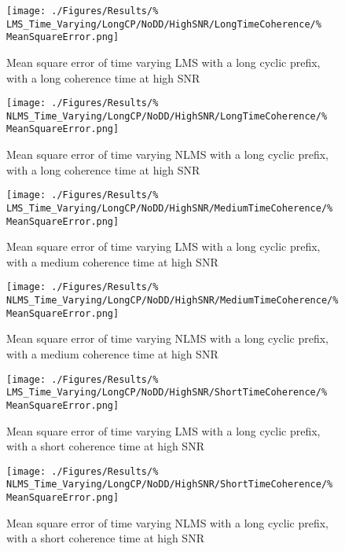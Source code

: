 \begin{figure}[ht]
	\begin{minipage}{0.49\textwidth}
		\texttt{[image: ./Figures/Results/\%
	LMS\_Time\_Varying/LongCP/NoDD/HighSNR/LongTimeCoherence/\%
	MeanSquareError.png]}
		\captionsetup{width=0.75\linewidth}
		\caption{Mean square error of time varying LMS with a 
		long cyclic prefix, with a long coherence time at 
		high SNR}
	\label{fig:LMS-Long-High-None-Long}
	\end{minipage}
	\begin{minipage}{0.49\textwidth}
		\texttt{[image: ./Figures/Results/\%
	NLMS\_Time\_Varying/LongCP/NoDD/HighSNR/LongTimeCoherence/\%
	MeanSquareError.png]}
		\captionsetup{width=0.75\linewidth}
		\caption{Mean square error of time varying NLMS with 
		a long cyclic prefix, with a long coherence time at 
		high SNR}
	\end{minipage}
\end{figure}

\begin{figure}[ht]
	\begin{minipage}{0.49\textwidth}
		\texttt{[image: ./Figures/Results/\%
	LMS\_Time\_Varying/LongCP/NoDD/HighSNR/MediumTimeCoherence/\%
	MeanSquareError.png]}
		\captionsetup{width=0.75\linewidth}
		\caption{Mean square error of time varying LMS with a 
		long cyclic prefix, with a medium coherence time at 
		high SNR}
	\label{fig:LMS-Medium-High-None-Long}
	\end{minipage}
	\begin{minipage}{0.49\textwidth}
		\texttt{[image: ./Figures/Results/\%
	NLMS\_Time\_Varying/LongCP/NoDD/HighSNR/MediumTimeCoherence/\%
	MeanSquareError.png]}
		\captionsetup{width=0.75\linewidth}
		\caption{Mean square error of time varying NLMS with 
		a long cyclic prefix, with a medium coherence time
		at high SNR}
	\end{minipage}
\end{figure}

\begin{figure}[ht]
	\centering
	\begin{minipage}{0.49\textwidth}
		\centering
		\texttt{[image: ./Figures/Results/\%
	LMS\_Time\_Varying/LongCP/NoDD/HighSNR/ShortTimeCoherence/\%
	MeanSquareError.png]}
		\captionsetup{width=0.75\linewidth}
		\caption{Mean square error of time varying LMS with a 
		long cyclic prefix, with a short coherence time at 
		high SNR}
		\label{fig:LMS-Short-High-None}
	\end{minipage}
	\begin{minipage}{0.49\textwidth}
		\centering
		\texttt{[image: ./Figures/Results/\%
	NLMS\_Time\_Varying/LongCP/NoDD/HighSNR/ShortTimeCoherence/\%
	MeanSquareError.png]}
		\captionsetup{width=0.75\linewidth}
		\caption{Mean square error of time varying NLMS with 
		a long cyclic prefix, with a short coherence time 
		at high SNR}
	\end{minipage}
\end{figure}

